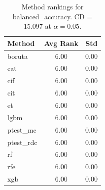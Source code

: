 \begin{table}[h]
\centering
\caption{Method rankings for balanced_accuracy. CD = 15.097 at $\alpha=0.05$.}
\label{tab:ranks_balanced_accuracy}
\begin{tabular}{lcc}
\toprule
Method & Avg Rank & Std \\
\midrule
boruta & 6.00 & 0.00 \\
cat & 6.00 & 0.00 \\
cif & 6.00 & 0.00 \\
cit & 6.00 & 0.00 \\
et & 6.00 & 0.00 \\
lgbm & 6.00 & 0.00 \\
ptest_mc & 6.00 & 0.00 \\
ptest_rdc & 6.00 & 0.00 \\
rf & 6.00 & 0.00 \\
rfe & 6.00 & 0.00 \\
xgb & 6.00 & 0.00 \\
\bottomrule
\end{tabular}
\end{table}